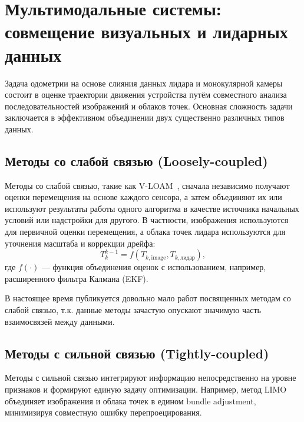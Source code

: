 \section{Мультимодальные системы: совмещение визуальных и лидарных данных}
Задача одометрии на основе слияния данных лидара и монокулярной камеры состоит 
в оценке траектории движения устройства путём совместного анализа 
последовательностей изображений и облаков точек. Основная сложность задачи 
заключается в эффективном объединении двух существенно различных типов данных.

\subsection{Методы со слабой связью (Loosely-coupled)}
Методы со слабой связью, такие как V-LOAM~\cite{zhang2015visual}, сначала независимо получают оценки 
перемещения на основе каждого сенсора, а затем объединяют их или используют результаты 
работы одного алгоритма в качестве источника начальных условий или надстройки для другого. 
В частности, изображения используются для первичной оценки перемещения, а облака точек лидара 
используются для уточнения масштаба и коррекции дрейфа:
\begin{equation}
T_k^{k-1} = f(T_{k,\text{image}}, T_{k,\text{лидар}}),
\end{equation}
где $f(\cdot)$ --- функция объединения оценок с использованием, например, расширенного фильтра Калмана (EKF).

В настоящее время публикуется довольно мало работ посвященных методам со слабой связью,
т.к. данные методы зачастую опускают значимую часть взаимосвязей между данными. 

\subsection{Методы с сильной связью (Tightly-coupled)}
Методы с сильной связью интегрируют информацию непосредственно на уровне признаков 
и формируют единую задачу оптимизации. Например, метод LIMO~\cite{graeter2018limo} объединяет изображения 
и облака точек в едином bundle adjustment, минимизируя совместную ошибку 
перепроецирования.


